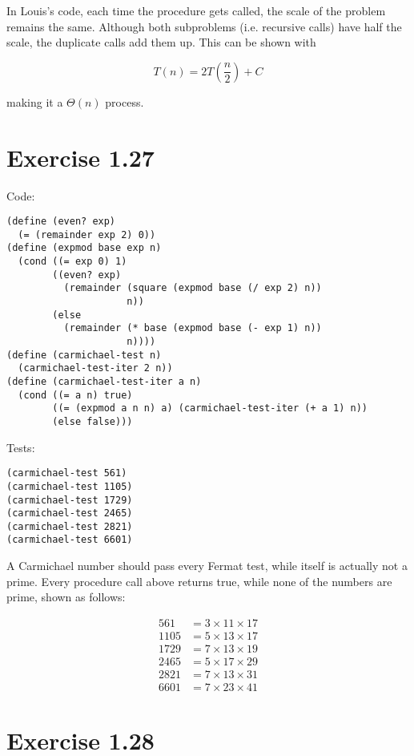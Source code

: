\documentclass[../main.tex]{subfiles}
\begin{document}
In Louis's code, each time the procedure gets called, the scale of the problem remains the same. Although
 both subproblems (i.e. recursive calls) have half the scale, the duplicate calls add them up.
 This can be shown with

$$
T(n) = 2T\left(\frac{n}{2}\right) + C
$$

making it a $\Theta(n)$ process.

\section{Exercise 1.27}

Code:

\begin{lstlisting}
(define (even? exp)
  (= (remainder exp 2) 0))
(define (expmod base exp n)
  (cond ((= exp 0) 1)
        ((even? exp)
          (remainder (square (expmod base (/ exp 2) n)) 
                     n))
        (else
          (remainder (* base (expmod base (- exp 1) n))
                     n))))
(define (carmichael-test n)
  (carmichael-test-iter 2 n))
(define (carmichael-test-iter a n)
  (cond ((= a n) true)
        ((= (expmod a n n) a) (carmichael-test-iter (+ a 1) n))
        (else false)))
\end{lstlisting}

Tests:

\begin{lstlisting}
(carmichael-test 561)
(carmichael-test 1105)
(carmichael-test 1729)
(carmichael-test 2465)
(carmichael-test 2821)
(carmichael-test 6601)
\end{lstlisting}

A Carmichael number should pass every Fermat test, while
 itself is actually not a prime. Every procedure call above
 returns true, while none of the numbers are prime, shown
 as follows:

\begin{align*}
561 &= 3 \times 11 \times 17 \\
1105 &= 5 \times 13 \times 17 \\
1729 &= 7 \times 13 \times 19 \\
2465 &= 5 \times 17 \times 29 \\
2821 &= 7 \times 13 \times 31 \\
6601 &= 7 \times 23 \times 41
\end{align*}

\section{Exercise 1.28}
\end{document}

